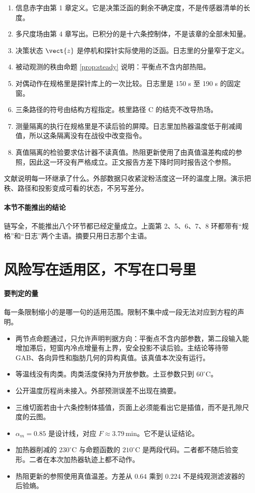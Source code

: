 \begin{enumerate}
\item 信息赤字由第 1 章定义。它是决策泛函的剩余不确定度，不是传感器清单的长度。
\item 多尺度场由第 4 章写出。已积分的是十六条控制体，不是该章的全部未知量。
\item 决策状态 \(\vect{z}\) 是停机和探针实际使用的泛函。日志里的分量窄于定义。
\item 被动观测的秩由命题 \ref{prop:steady} 说明：平衡点不含内部热阻。
\item 对偶动作在规格里是探针库上的一次比较。日志里是 150 s 至 190 s 的固定窗。
\item 三条路径的符号由结构方程指定。核里路径 C 的结壳不改导热场。
\item 测量隔离的执行在规格里是不读后验的屏障。日志里加热器温度低于削减阈值，所以这条隔离没有在战役中改变指令。
\item 真值隔离的检验要求估计器不读真值。热阻更新使用了由真值温差构成的参照，因此这一环没有严格成立。正文报告方差下降时同时报告这个参照。
\end{enumerate}

文献说明每一环继承了什么。外部数据只收紧淀粉活度这一环的温度上限。演示把秩、路径和投影变成可看的状态，不另写差分。

\paragraph{本节不能推出的结论}
链写全，不能推出八个环节都已经定量成立。上面第 2、5、6、7、8 环都带有“规格”和“日志”两个主语。摘要只用日志那个主语。

\section{风险写在适用区，不写在口号里}

\paragraph{要判定的量}
每一条限制缩小的是哪一句的适用范围。限制不集中成一段无法对应到方程的声明。

\begin{itemize}
\item 两节点命题通过，只允许声明判据方向：平衡点不含内部参数，第二段输入能增加滞后，短窗内冷点增量有上界，安全投影不读后验。主结论等待带 GAB、各向异性和脂肪几何的异构真值。该真值本次没有运行。
\item 等温线没有肉类。肉类活度保持为开放参数。土豆参数只到 \(60^\circ\mathrm{C}\)。
\item 公开温度历程尚未接入。外部预测误差不出现在摘要。
\item 三维切面若由十六条控制体插值，页面上必须能看出它是插值，而不是孔隙尺度的云图。
\item \(\alpha_m=0.85\) 是设计线，对应 \(F\approx 3.79\,\mathrm{min}\)。它不是认证结论。
\item 加热器削减的 \(230^\circ\mathrm{C}\) 与命题函数的 \(210^\circ\mathrm{C}\) 是两段代码。二者都不随后验变形。二者在本次加热器轨迹上都不动作。
\item 热阻更新的参照使用真值温差。方差从 \(0.64\) 乘到 \(0.224\) 不是纯观测滤波器的后验熵。
\end{itemize}

